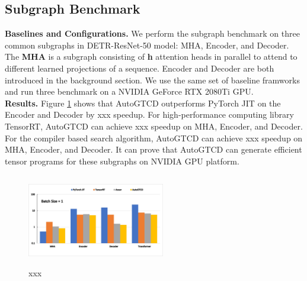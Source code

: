 \subsection{Subgraph Benchmark}
\textbf{Baselines and Configurations.} We perform the subgraph benchmark on three common subgraphs in DETR-ResNet-50 model: MHA, Encoder, and Decoder. The \textbf{MHA} is a subgraph consisting of \textbf{h} attention heads in parallel to attend to different learned projections of a sequence. Encoder and Decoder are both introduced in the background section. We use the same set of baseline framworks and run three benchmark on a NVIDIA GeForce RTX 2080Ti GPU.\\
\textbf{Results.} Figure \ref{fig:fig8} shows that AutoGTCD outperforms PyTorch JIT on the Encoder and Decoder by xxx speedup. 
For high-performance computing library TensorRT, AutoGTCD can achieve xxx speedup on MHA, Encoder, and Decoder.
For the compiler based search algorithm, AutoGTCD can achieve xxx speedup on MHA, Encoder, and Decoder.
It can prove that AutoGTCD can generate efficient tensor programs for these subgraphs on NVIDIA GPU platform.


\begin{figure}[htbp]
    \centering
    \includegraphics[height=4cm, width=6cm]{figs/fig8}
    \caption{xxx}
    \label{fig:fig8}
\end{figure}



